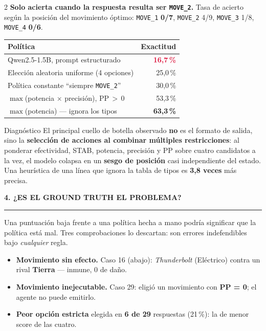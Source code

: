 \documentclass[9pt,a4paper]{extarticle}
\newcommand{\heading}[1]{%
  \par\vspace{1.1mm}\noindent
  {\color{navy}\bfseries\small\MakeUppercase{#1}}
  \par\vspace{0.7mm}\noindent
  {\color{amber}\rule{\linewidth}{1.1pt}}
  \par\vspace{0.6mm}\noindent\ignorespaces}
\begin{document}
\begin{multicols}{2}
\textbf{Solo acierta cuando la respuesta resulta ser \texttt{MOVE\_2}.} Tasa de acierto seg\'un la posici\'on del movimiento \'optimo: \texttt{MOVE\_1} \textbf{0/7}, \texttt{MOVE\_2} 4/9, \texttt{MOVE\_3} 1/8, \texttt{MOVE\_4} \textbf{0/6}.

\vspace{0.6mm}

{\centering
\begin{tabular}{@{}lr@{}}
\toprule
\textbf{Pol\'itica} & \textbf{Exactitud}\\
\midrule
Qwen2.5-1.5B, prompt estructurado   & \textcolor{crimson}{\textbf{16,7\,\%}}\\
Elecci\'on aleatoria uniforme (4 opciones) & 25,0\,\%\\
Pol\'itica constante ``siempre \texttt{MOVE\_2}'' & 30,0\,\%\\
$\max$(potencia $\times$ precisi\'on), PP\,$>$\,0 & 53,3\,\%\\
$\max$(potencia) --- ignora los tipos & \textbf{63,3\,\%}\\
\bottomrule
\end{tabular}\par}
\vspace{1.4mm}

\begin{keybox}{Diagn\'ostico}
El principal cuello de botella observado \textbf{no} es el formato de salida, sino la \textbf{selecci\'on de acciones al combinar m\'ultiples restricciones}: al ponderar efectividad, STAB, potencia, precisi\'on y PP sobre cuatro candidatos a la vez, el modelo colapsa en un \textbf{sesgo de posici\'on} casi independiente del estado. Una heur\'istica de una l\'inea que ignora la tabla de tipos es \textbf{3,8 veces} m\'as precisa.
\end{keybox}

\heading{4. \textmd{\bfseries ¿}Es el ground truth el problema?}
Una puntuaci\'on baja frente a una pol\'itica hecha a mano podr\'ia significar que la pol\'itica est\'a mal. Tres comprobaciones lo descartan: son errores indefendibles bajo \emph{cualquier} regla.
\begin{itemize}
\item \textbf{Movimiento sin efecto.} Caso 16 (abajo): \emph{Thunderbolt} (El\'ectrico) contra un rival \textbf{Tierra} --- inmune, 0 de da\~no.
\item \textbf{Movimiento inejecutable.} Caso 29: eligi\'o un movimiento con \textbf{PP = 0}; el agente no puede emitirlo.
\item \textbf{Peor opci\'on estricta} elegida en \textbf{6 de 29} respuestas (21\,\%): la de menor score de las cuatro.
\end{itemize}


\end{multicols}
\end{document}
